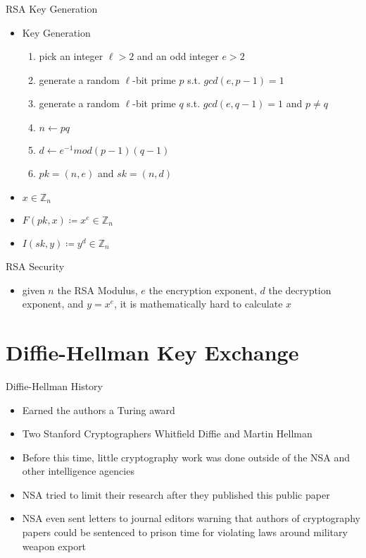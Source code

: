 \documentclass[]{beamer}
\begin{document}
\begin{frame}{RSA Key Generation}
    \begin{itemize}
        \item Key Generation
        \begin{enumerate}
            \item \pause pick an integer \(\ell > 2\) and an odd integer \(e > 2\) 
            \item \pause generate a random \(\ell\)-bit prime \(p\) s.t. \(gcd(e, p-1) = 1\)
            \item \pause generate a random \(\ell\)-bit prime \(q\) s.t. \(gcd(e, q-1) = 1\) and \(p \neq q\)
            \item \pause \(n \leftarrow pq\)
            \item \pause \(d \leftarrow e^{-1}mod (p-1)(q-1) \)
            \item \pause \(pk = (n, e)\) and \(sk = (n, d)\)
        \end{enumerate}
        \item \pause \(x \in \mathbb{Z}_n\)
        \item \pause \(F(pk, x) \coloneqq x^e \in \mathbb{Z}_n\) 
        \item \pause \(I(sk, y) \coloneqq y^d \in \mathbb{Z}_n\) 
    \end{itemize}
\end{frame}

\begin{frame}{RSA Security}
    \begin{itemize}
        \item \pause given \(n\) the RSA Modulus, \(e\) the encryption exponent, \(d\) the decryption exponent, and \(y = x^e\), it is mathematically hard to calculate \(x\)
    \end{itemize}
\end{frame}

\section{Diffie-Hellman Key Exchange}

\begin{frame}{Diffie-Hellman History}
    \begin{itemize}
        \item \pause Earned the authors a Turing award
        \item \pause Two Stanford Cryptographers Whitfield Diffie and Martin Hellman
        \item \pause Before this time, little cryptography work was done outside of the NSA and other intelligence agencies
        \item \pause NSA tried to limit their research after they published this public paper
        \item \pause NSA even sent letters to journal editors warning that authors of cryptography papers could be sentenced to prison time for violating laws around military weapon export
    \end{itemize}
\end{frame}
\end{document}
